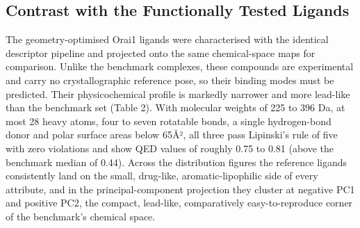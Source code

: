 \hypertarget{contrast-with-the-functionally-tested-ligands}{%
\subsection{Contrast with the Functionally Tested Ligands}\label{contrast-with-the-functionally-tested-ligands}}

The geometry-optimised Orai1 ligands were characterised with the identical descriptor pipeline and projected onto the same chemical-space maps for comparison. Unlike the benchmark complexes, these compounds are experimental and carry no crystallographic reference pose, so their binding modes must be predicted. Their physicochemical profile is markedly narrower and more lead-like than the benchmark set (Table 2). With molecular weights of 225 to 396 Da, at most 28 heavy atoms, four to seven rotatable bonds, a single hydrogen-bond donor and polar surface areas below 65Å², all three pass Lipinski's rule of five with zero violations and show QED values of roughly 0.75 to 0.81 (above the benchmark median of 0.44). Across the distribution figures the reference ligands consistently land on the small, drug-like, aromatic-lipophilic side of every attribute, and in the principal-component projection they cluster at negative PC1 and positive PC2, the compact, lead-like, comparatively easy-to-reproduce corner of the benchmark's chemical space.

